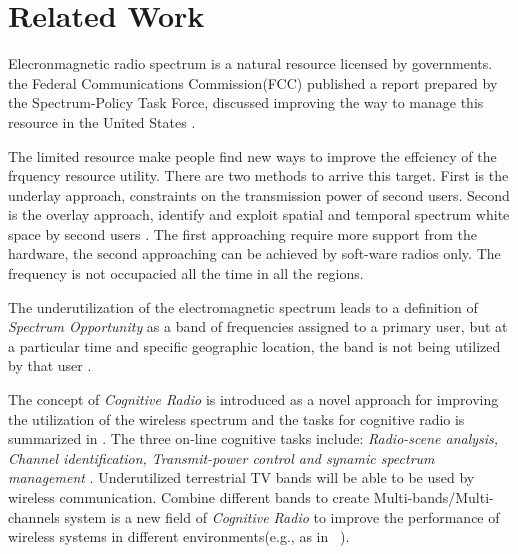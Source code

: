 \section{Related Work}
\label{sec:related}


Elecronmagnetic radio spectrum is a natural resource licensed by governments.  the Federal Communications Commission(FCC) published a report prepared by the Spectrum-Policy Task Force, discussed improving the way to manage this resource in the United States \cite{federal2002spectrum}. 

The limited resource make people find new ways to improve the effciency of the frquency resource utility. There are two methods to arrive this target. First is the underlay approach, constraints on the transmission power of second users. Second is the overlay approach, identify and exploit spatial and temporal spectrum white space by second users \cite{zhao2007survey}.
The first approaching require more support from the hardware, the second approaching can be achieved by soft-ware radios only. The frequency is not occupacied all the time in all the regions.





The underutilization of the electromagnetic spectrum leads to a definition of \emph{Spectrum Opportunity} as a band of frequencies assigned to a primary user, but at a particular time and specific geographic location, the band is not being utilized by that user \cite{kolodzy2001next}.




The concept of \emph{Cognitive Radio} is introduced as a novel approach for improving the utilization of the wireless spectrum and the tasks for cognitive radio is summarized in \cite{haykin2005cognitive}. The three on-line cognitive tasks include: \emph{Radio-scene analysis, Channel identification, Transmit-power control and synamic spectrum management} \cite{haykin2005cognitive}.
Underutilized terrestrial TV bands will be able to be used by wireless communication. Combine different bands to create Multi-bands/Multi-channels system is a new field of \emph{Cognitive Radio} to improve the performance of wireless systems in different
environments(e.g., as in ~\cite{MOAR}). 

